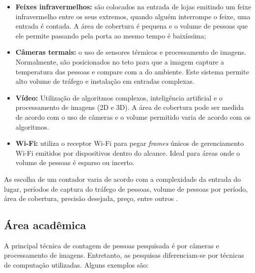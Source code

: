 \begin{itemize}
  \item \textbf{Feixes infravermelhos:} são colocados
na entrada de lojas emitindo um feixe infravermelho entre os seus extremos,
quando alguém interrompe o feixe, uma entrada é contada. A área de cobertura é
pequena e o volume de pessoas que ele permite passando pela porta ao mesmo
tempo é baixíssima;
  \item \textbf{Câmeras termais:} o uso de sensores térmicos e
processamento de imagens. Normalmente,
são posicionados no teto para que a imagem capture a temperatura das pessoas
e compare com a do ambiente. Este sistema permite alto volume de tráfego e instalação em entradas complexas.
  \item \textbf{Vídeo:} Utilização de algoritmos complexos, inteligência artificial
   e o processamento de imagens (2D e 3D). A área de cobertura
  pode ser medida de acordo com o uso de câmeras e o volume permitido varia de acordo com os algoritmos.
  \item \textbf{Wi-Fi:} utiliza o receptor Wi-Fi para pegar \emph{frames} únicos de gerenciamento Wi-Fi emitidos por dispositivos
  dentro do alcance. Ideal para áreas onde o volume de pessoas é esparso ou incerto.
\end{itemize}

As escolha de um contador varia de acordo com a complexidade da entrada do lugar, períodos de captura do tráfego de pessoas,
volume de pessoas por período, área de cobertura, precisão desejada, preço, entre outros \cite{trafsys} \cite{Axper2017}.

\subsection{Área acadêmica}
A principal técnica de contagem de pessoas pesquisada é por câmeras e processamento de imagens. Entretanto,
as pesquisas diferenciam-se por técnicas de computação utilizadas. Alguns exemplos são:


